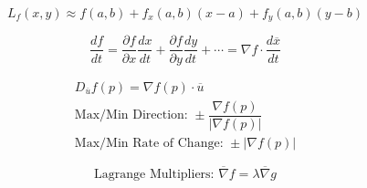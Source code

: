 \documentclass[12pt]{article}
\begin{document}
\vspace{-30pt}

\begin{multicols}{2}

  \begin{equation*}
    L_f(x,y)\approx f(a,b) + f_x(a,b)(x-a) + f_y(a,b)(y-b)
  \end{equation*}
    
  \begin{equation*}
    \dfrac{df}{dt}=\dfrac{\partial f}{\partial x}\dfrac{dx}{dt} + \dfrac{\partial f}{\partial y}\dfrac{dy}{dt} + \cdots = \nabla f\cdot\frac{d\overline{x}}{dt}
  \end{equation*}

\end{multicols}

\vspace{-30pt}

\begin{multicols}{2}

  \begin{equation*}
    \begin{split}
    D_{\overline{u}}f(p)=\nabla f(p)\cdot\overline{u}\\
    \text{Max/Min Direction: } \pm\dfrac{\nabla f(p)}{|\nabla f(p)|}\\
    \text{Max/Min Rate of Change: }\pm|\nabla f(p)|
  \end{split}
  \end{equation*}
    
  \begin{equation*}
    \text{Lagrange Multipliers: }\overline{\nabla}f=\lambda\overline{\nabla}g
  \end{equation*}

\end{multicols}

\vspace{-70pt}
\end{document}
